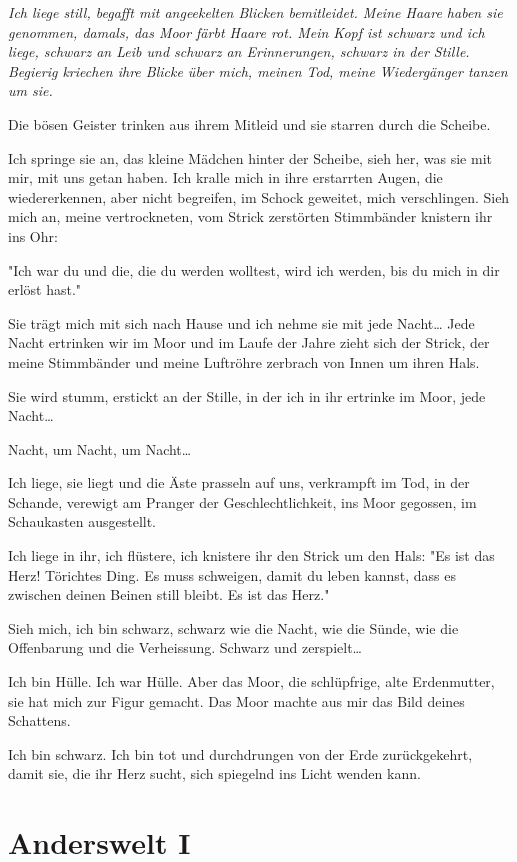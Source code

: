\documentclass[10pt,a5paper]{book}
\begin{document}
{\em Ich liege still, begafft  mit angeekelten Blicken bemitleidet. Meine Haare haben sie genommen, damals, das Moor färbt Haare rot.
Mein Kopf ist schwarz und ich liege, schwarz an Leib und schwarz an Erinnerungen, schwarz in der Stille. Begierig kriechen ihre Blicke über mich, meinen Tod, meine Wiedergänger tanzen um sie.

Die bösen Geister trinken aus ihrem Mitleid und sie starren durch die Scheibe.

Ich springe sie an, das kleine Mädchen hinter der Scheibe, sieh her, was sie mit mir, mit uns getan haben. Ich kralle mich in ihre erstarrten Augen, die wiedererkennen, aber nicht begreifen, im Schock geweitet, mich verschlingen. Sieh mich an, meine vertrockneten, vom Strick zerstörten Stimmbänder knistern ihr ins Ohr:

"Ich war du und die, die du werden wolltest, wird ich werden, bis du mich in dir erlöst hast."

Sie trägt mich mit sich nach Hause und ich nehme sie mit jede Nacht\dots
Jede Nacht ertrinken wir im Moor und im Laufe der Jahre zieht sich der Strick, der meine Stimmbänder und meine Luftröhre zerbrach von Innen um ihren Hals.

Sie wird stumm, erstickt an der Stille, in der ich in ihr ertrinke im Moor, jede Nacht\dots

Nacht, um Nacht, um Nacht\dots

Ich liege, sie liegt und die Äste prasseln auf uns, verkrampft im Tod, in der Schande, verewigt am Pranger der Geschlechtlichkeit, ins Moor gegossen, im Schaukasten ausgestellt.

Ich liege in ihr, ich flüstere, ich knistere ihr den Strick um den Hals:
"Es ist das Herz! Törichtes Ding. Es muss schweigen, damit du leben kannst, dass es zwischen deinen Beinen still bleibt. Es ist das Herz."

Sieh mich, ich bin schwarz, schwarz wie die Nacht, wie die Sünde, wie die Offenbarung und die Verheissung. Schwarz und zerspielt\dots

Ich bin Hülle. Ich war Hülle. Aber das Moor, die schlüpfrige, alte Erdenmutter, sie hat mich zur Figur gemacht. Das Moor machte aus mir das Bild deines Schattens.

Ich bin schwarz. Ich bin tot und durchdrungen von der Erde zurückgekehrt, damit sie, die ihr Herz sucht, sich spiegelnd ins Licht wenden kann.}


\section*{Anderswelt I}
\end{document}
